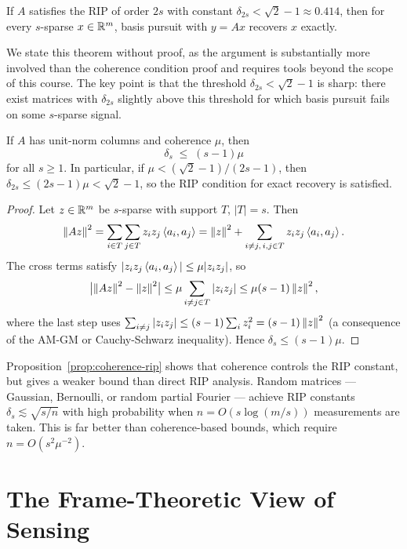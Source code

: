 \begin{theorem}
\label{thm:rip-recovery}
If $A$ satisfies the RIP of order $2s$ with constant $\delta_{2s} <
\sqrt{2}-1 \approx 0.414$, then for every $s$-sparse $x\in\mathbb{R}^m$,
basis pursuit with $y=Ax$ recovers $x$ exactly.
\end{theorem}

We state this theorem without proof, as the argument is substantially
more involved than the coherence condition proof and requires tools
beyond the scope of this course. The key point is that the threshold
$\delta_{2s}<\sqrt{2}-1$ is sharp: there exist matrices with
$\delta_{2s}$ slightly above this threshold for which basis pursuit
fails on some $s$-sparse signal.

\begin{proposition}
\label{prop:coherence-rip}
If $A$ has unit-norm columns and coherence $\mu$, then
\[
  \delta_s \;\le\; (s-1)\mu
\]
for all $s\ge 1$. In particular, if $\mu < (\sqrt{2}-1)/(2s-1)$,
then $\delta_{2s}\le(2s-1)\mu<\sqrt{2}-1$, so the RIP condition for
exact recovery is satisfied.
\end{proposition}

\begin{proof}
Let $z\in\mathbb{R}^m$ be $s$-sparse with support $T$, $|T|=s$. Then
\[
  \left\| Az \right\|^2 = \sum_{i\in T}\sum_{j\in T}z_iz_j\left\langle a_i, a_j \right\rangle
  = \left\| z \right\|^2 + \sum_{i\ne j,\,i,j\in T}z_iz_j\left\langle a_i, a_j \right\rangle.
\]
The cross terms satisfy $|z_iz_j\left\langle a_i, a_j \right\rangle|\le\mu|z_iz_j|$, so
\[
  \bigl|\left\| Az \right\|^2 - \left\| z \right\|^2\bigr|
  \le \mu\sum_{i\ne j\in T}|z_iz_j|
  \le \mu(s-1)\left\| z \right\|^2,
\]
where the last step uses $\sum_{i\ne j}|z_iz_j|\le (s-1)\sum_i z_i^2
= (s-1)\left\| z \right\|^2$ (a consequence of the AM-GM or Cauchy-Schwarz
inequality). Hence $\delta_s\le(s-1)\mu$.
\end{proof}

\begin{remark*}
Proposition~\ref{prop:coherence-rip} shows that coherence controls
the RIP constant, but gives a weaker bound than direct RIP analysis.
Random matrices --- Gaussian, Bernoulli, or random partial Fourier ---
achieve RIP constants $\delta_s \lesssim \sqrt{s/n}$ with high
probability when $n = O(s\log(m/s))$ measurements are taken. This is
far better than coherence-based bounds, which require $n = O(s^2\mu^{-2})$.
\end{remark*}

\section{The Frame-Theoretic View of Sensing}
\label{sec:frame-view}

